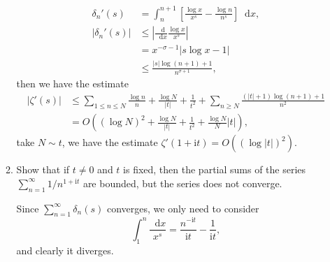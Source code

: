 \documentclass[11pt]{report}
\theoremstyle{mythm}
\let\oldendproof\endproof
\renewenvironment{proof}[1][\proofname]{%
  \oldproof[\normalfont \bfseries #1]%
}{\oldendproof}
\renewcommand*{\proofname}{Proof}
\theoremstyle{myans}
\newcommand{\mi}{\mathrm{i}}
\newcommand{\dd}{\mathop{}\!\mathrm{d}}
\begin{document}
\begin{enumerate}
\begin{enumerate}
\begin{proof}
\begin{align*}
        \delta_n'(s) &= \int_n^{n+1} \left[\frac{\log x}{x^s} - \frac{\log n}{n^s}\right] \dd x,\\
        \left| \delta_n'(s)\right| &\leq \left| \frac{\dd}{\dd x} \frac{\log x}{x^s} \right|\\
        &= x^{-\sigma - 1} |s \log x - 1|\\
        &\leq \frac{|s|\log (n+1) + 1}{n^{\sigma + 1}},
      \end{align*}
      then we have the estimate
      \begin{align*}
        |\zeta'(s)| &\leq \sum_{1\leq n\leq N} \frac{\log n}{n} + \frac{\log N}{|t|}
        + \frac 1{t^2} + \sum_{n\geq N}\frac{(|t|+1)\log(n+1) + 1}{n^2}\\
        &= O\left( (\log N)^2 + \frac{\log N}{|t|} + \frac 1{t^2} + \frac{\log N}{N}|t| \right),
      \end{align*}
      take $N \sim t$, we have the estimate $\zeta'(1 + \mi t) = O((\log |t|)^2)$.
    \end{proof}
    \item  Show that if $t\neq 0$ and $t$ is fixed, then the partial sums of the series
    $\sum_{n=1}^\infty 1/n^{1+\mi t}$ are bounded, but the series does not converge.
    \begin{proof}
      Since $\sum_{n=1}^\infty \delta_n(s)$ converges, we only need to consider
      \[ \int_1^n \frac {\dd x}{x^s} = \frac{n^{-\mi t}}{\mi t} - \frac 1{\mi t}, \]
      and clearly it diverges.
    \end{proof}
  \end{enumerate}
\end{enumerate}
\end{document}
